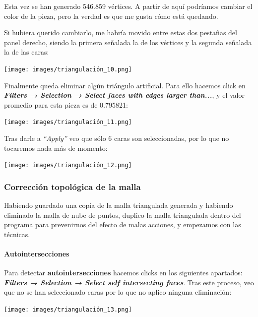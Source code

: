 \documentclass[options]{article}
\begin{document}
Esta vez se han generado 546.859 vértices. A partir de aquí podríamos cambiar el color de la pieza, pero la verdad es que me gusta cómo está quedando. 

\pagebreak

Si hubiera querido cambiarlo, me habría movido entre estas dos pestañas del panel derecho, siendo la primera señalada la de los vértices y la segunda señalada la de las caras:

\begin{center}
    \texttt{[image: images/triangulación\_10.png]}    
\end{center}

Finalmente queda eliminar algún triángulo artificial. Para ello hacemos click en \textbf{\textit{Filters → Selection → Select faces with edges larger than...}}, y el valor promedio para esta pieza es de 0.795821:

\begin{center}
    \texttt{[image: images/triangulación\_11.png]}    
\end{center}

Tras darle a \textit{``Apply''} veo que sólo 6 caras son seleccionadas, por lo que no tocaremos nada más de momento:

\begin{center}
    \texttt{[image: images/triangulación\_12.png]}    
\end{center}
\subsubsection{Corrección topológica de la malla}

Habiendo guardado una copia de la malla triangulada generada y habiendo eliminado la malla de nube de puntos, duplico la malla triangulada dentro del programa para prevenirnos del efecto de malas acciones, y empezamos con las técnicas.

\paragraph{Autointersecciones}
Para detectar \textbf{autointersecciones} hacemos clicks en los siguientes apartados: \textbf{\textit{Filters → Selection → Select self intersecting faces}}. Tras este proceso, veo que no se han seleccionado caras por lo que no aplico ninguna eliminación:

\begin{center}
    \texttt{[image: images/triangulación\_13.png]}    
\end{center}
\end{document}

